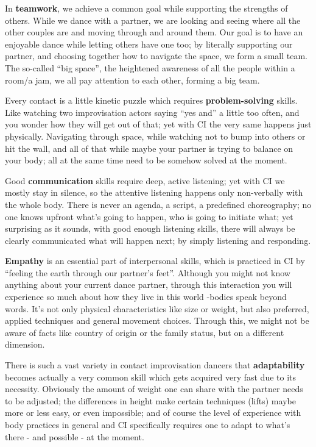 In \textbf{teamwork}, we achieve a common goal while supporting the strengths of others.
While we dance with a partner, we are looking and seeing where all the other couples are and moving through and around them.
Our goal is to have an enjoyable dance while letting others have one too;
by literally supporting our partner, and choosing together how to navigate the space, we form a small team.
The so-called ``big space'', the heightened awareness of all the people within a room/a jam, we all pay attention to each other, forming a big team.

Every contact is a little kinetic puzzle which requires \textbf{problem-solving} skills.
Like watching two improvisation actors saying ``yes and'' a little too often, and you wonder how they will get out of that; yet with CI the very same happens just physically.
Navigating through space, while watching not to bump into others or hit the wall, and all of that while maybe your partner is trying to balance on your body; all at the same time need to be somehow solved at the moment.

Good \textbf{communication} skills require deep, active listening;
yet with CI we mostly stay in silence, so the attentive listening happens only non-verbally with the whole body.
There is never an agenda, a script, a predefined choreography;
no one knows upfront what's going to happen, who is going to initiate what; yet surprising as it sounds, with good enough listening skills, there will always be clearly communicated what will happen next; by simply listening and responding.

\textbf{Empathy} is an essential part of interpersonal skills, which is practiced in CI by ``feeling the earth through our partner's feet''.
Although you might not know anything about your current dance partner, through this interaction you will experience so much about how they live in this world -bodies speak beyond words.
It's not only physical characteristics like size or weight, but also preferred, applied techniques and general movement choices.
Through this, we might not be aware of facts like country of origin or the family status, but on a different dimension.

There is such a vast variety in contact improvisation dancers that \textbf{adaptability} becomes actually a very common skill which gets acquired very fast due to its necessity.
Obviously the amount of weight one can share with the partner needs to be adjusted;
the differences in height make certain techniques (lifts) maybe more or less easy, or even impossible; and of course the level of experience with body practices in general and CI specifically requires one to adapt to what's there - and possible - at the moment.

